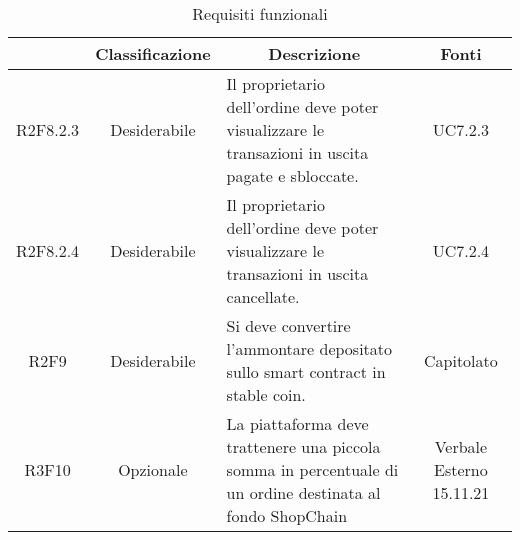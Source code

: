 \begin{table}[H]
    \centering
    \renewcommand{\arraystretch}{1.8}
    \begin{tabular}{c | c | p{6cm} | c}
        \rowcolor[HTML]{125E28}
        \multicolumn{1}{c}{\color[HTML]{FFFFFF} \textbf{Codice}}          &
        \multicolumn{1}{c}{\color[HTML]{FFFFFF} \textbf{Classificazione}} &
        \multicolumn{1}{c}{\color[HTML]{FFFFFF} \textbf{Descrizione}}     &
        \multicolumn{1}{c}{\color[HTML]{FFFFFF} \textbf{Fonti}}                                                                                                                                                                 \\
        \hline
        R2F8.2.3                                                          & Desiderabile & Il proprietario dell'ordine deve poter visualizzare le transazioni in uscita pagate e sbloccate.          & UC7.2.3                  \\
        R2F8.2.4                                                          & Desiderabile & Il proprietario dell'ordine deve poter visualizzare le transazioni in uscita cancellate.                  & UC7.2.4                  \\
        R2F9                                                              & Desiderabile & Si deve convertire l'ammontare depositato sullo smart contract in stable coin.                            & Capitolato               \\
        R3F10                                                             & Opzionale    & La piattaforma deve trattenere una piccola somma in percentuale di un ordine destinata al fondo ShopChain & Verbale Esterno 15.11.21 \\
    \end{tabular}
    \caption{Requisiti funzionali}
\end{table}

